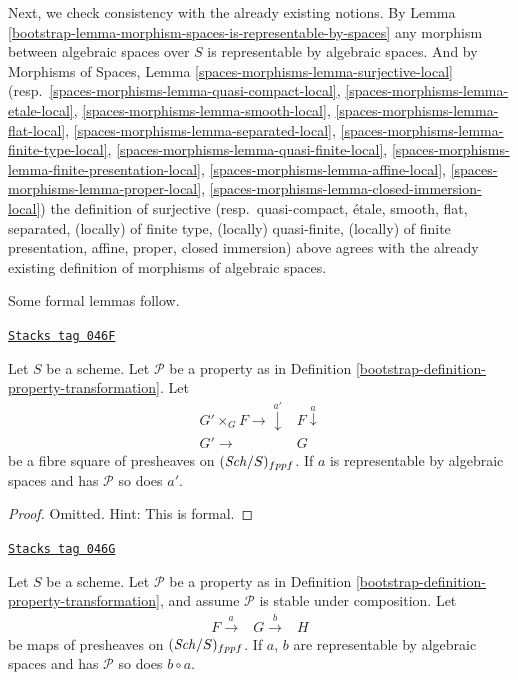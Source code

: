 \medskip\noindent
Next, we check consistency with the already existing notions. By
Lemma \ref{bootstrap-lemma-morphism-spaces-is-representable-by-spaces}
any morphism between algebraic spaces over $S$ is representable by
algebraic spaces. And by
Morphisms of Spaces,
Lemma \ref{spaces-morphisms-lemma-surjective-local}
(resp.\ \ref{spaces-morphisms-lemma-quasi-compact-local},
\ref{spaces-morphisms-lemma-etale-local},
\ref{spaces-morphisms-lemma-smooth-local},
\ref{spaces-morphisms-lemma-flat-local},
\ref{spaces-morphisms-lemma-separated-local},
\ref{spaces-morphisms-lemma-finite-type-local},
\ref{spaces-morphisms-lemma-quasi-finite-local},
\ref{spaces-morphisms-lemma-finite-presentation-local},
\ref{spaces-morphisms-lemma-affine-local},
\ref{spaces-morphisms-lemma-proper-local},
\ref{spaces-morphisms-lemma-closed-immersion-local})
the definition of
surjective
(resp.\ quasi-compact,
\'etale,
smooth,
flat,
separated,
(locally) of finite type,
(locally) quasi-finite,
(locally) of finite presentation,
affine,
proper,
closed immersion)
above agrees with the already existing definition of morphisms
of algebraic spaces.

\medskip\noindent
Some formal lemmas follow.

\begin{lemma}
\label{bootstrap-lemma-base-change-transformation-property}
\href{https://stacks.math.columbia.edu/tag/046F}{\texttt{Stacks tag 046F}}

Let $S$ be a scheme.
Let $\mathcal{P}$ be a property as in
Definition \ref{bootstrap-definition-property-transformation}.
Let
$$
\begin{array}{cc}G' \times_G F \longrightarrow\overset{a'}{\downarrow} & F \overset{a}{\downarrow} \\ G' \longrightarrow & G\end{array}
$$
be a fibre square of presheaves on $(\mathit{Sch}/S)_{fppf}$.
If $a$ is representable by algebraic spaces and has $\mathcal{P}$
so does $a'$.
\end{lemma}

\begin{proof}
Omitted. Hint: This is formal.
\end{proof}

\begin{lemma}
\label{bootstrap-lemma-composition-transformation-property}
\href{https://stacks.math.columbia.edu/tag/046G}{\texttt{Stacks tag 046G}}

Let $S$ be a scheme.
Let $\mathcal{P}$ be a property as in
Definition \ref{bootstrap-definition-property-transformation},
and assume $\mathcal{P}$ is stable under composition.
Let
$$
\begin{array}{ccc}F \overset{a}{\longrightarrow} & G \overset{b}{\longrightarrow} & H\end{array}
$$
be maps of presheaves on $(\mathit{Sch}/S)_{fppf}$.
If $a$, $b$ are representable by algebraic spaces and has
$\mathcal{P}$ so does $b \circ a$.
\end{lemma}

